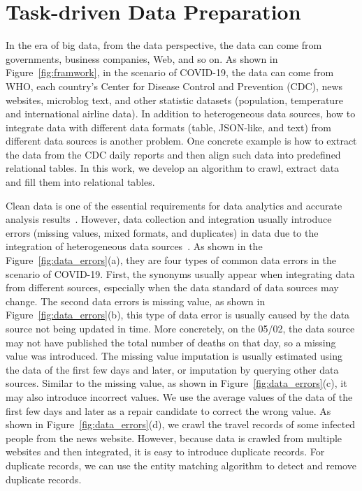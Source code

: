 \section{Task-driven Data Preparation}
\label{sec:dataprep}



In the era of big data, from the data perspective, the data can come from governments, business companies, Web, and so on. 
As shown in Figure~\ref{fig:framwork}, in the scenario of COVID-19, the data can come from WHO, each country's Center for Disease Control and Prevention (CDC), news websites, microblog text,  and other statistic datasets (\eg population, temperature and international airline data). 
In addition to heterogeneous data sources, how to integrate data with different data formats (\eg table, JSON-like, and text) from different data sources is another problem.
One concrete example is how to extract the data from the CDC daily reports and then align such data into predefined relational tables.
In this work, we develop an algorithm to crawl, extract data and fill them into relational tables.

Clean data is one of the essential requirements for data analytics and accurate analysis results~\cite{DBLP:journals/pvldb/AbedjanCDFIOPST16, DBLP:conf/cidr/BinnigSKUZZ17}. However, data collection and integration usually introduce errors (\eg missing values, mixed formats, and duplicates) in data due to the integration of heterogeneous data sources~\cite{10.14778/3137765.3137833}. 
%
As shown in the Figure~\ref{fig:data_errors}(a), they are four types of common data errors in the scenario of COVID-19. 
%
First, the synonyms usually appear when integrating data from different sources, especially when the data standard of data sources may change. 
%
The second data errors is missing value, as shown in Figure~\ref{fig:data_errors}(b), this type of data error is usually caused by the data source not being updated in time. 
More concretely, on the 05/02, the data source may not have published the total number of deaths on that day, so a missing value was introduced. The missing value imputation is usually estimated using the data of the first few days and later, or imputation by querying other data sources.
%
Similar to the missing value, as shown in Figure~\ref{fig:data_errors}(c), it may also introduce incorrect values. We use the average values of the data of the first few days and later as a repair candidate to correct the wrong value.
%
As shown in Figure~\ref{fig:data_errors}(d), we crawl the travel records of some infected people from the news website. However, because data is crawled from multiple websites and then integrated, it is easy to introduce duplicate records. For duplicate records, we can use the entity matching algorithm to detect and remove duplicate records.
%

